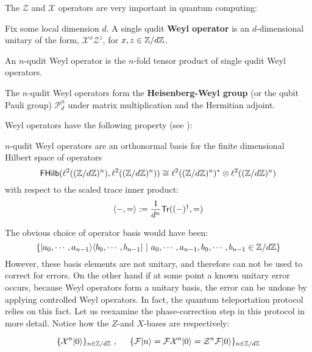 The $\mathcal Z$ and $\mathcal X$ operators are very important in quantum computing:
\begin{definition}
\label{definition:begin}
Fix some local dimension $d$.
A single qudit {\bf Weyl operator} is an $d$-dimensional unitary of the form, $\mathcal{X}^{x}\mathcal{Z}^{z}$, for $x,z \in \mathbb{Z}/d\mathbb{Z}$.

An $n$-qudit Weyl operator is the $n$-fold tensor product of single qudit Weyl operators.

The $n$-qudit Weyl operators form the {\bf Heisenberg-Weyl group} (or the qubit Pauli group) $\mathcal{P}_d^n$ under matrix multiplication and the Hermitian adjoint.
\end{definition}
Weyl operators have the following property (see \cite[\S 10.3.1]{nielsen}):
\begin{lemma}
\label{lem:ueb}
$n$-qudit Weyl operators are an orthonormal basis for the finite dimensional  Hilbert space of operators
$$
\mathsf{FHilb}(\ell^2((\mathbb{Z}/d\mathbb{Z})^n), \ell^2((\mathbb{Z}/d\mathbb{Z})^n))
\cong \ell^2((\mathbb{Z}/d\mathbb{Z})^n)^*\otimes \ell^2((\mathbb{Z}/d\mathbb{Z})^n)
$$
with respect to the scaled trace inner product:
$$
\langle  -,= \rangle
:=
\dfrac{1}{d^n}\mathsf{Tr}((-)^\dag,=)
$$
\end{lemma}
The obvious choice of operator basis would have been:
$$
\{ |a_0, \cdots, a_{n-1} \rangle \langle  b_0,\cdots, b_{n-1} | \ | \ a_0,\cdots, a_{n-1},b_0,\cdots, b_{n-1} \in \mathbb{Z}/d\mathbb{Z} \}
$$
However, these basis elements are not unitary, and therefore can not be used to correct for errors.
On the other hand if at some point a known unitary error occurs,  because Weyl operators form a unitary basis, the error can be undone by applying controlled Weyl operators.
In fact, the quantum teleportation protocol relies on this fact.
Let us reexamine the phase-correction step in this protocol in more detail.
Notice how the $Z$-and $X$-bases are respectively: 

$$\{ \mathcal{X}^n|0\rangle \}_{n\in \Z/d\Z}
\ , \hspace{,5cm} \{\mathcal{F}|n\rangle=\mathcal{F} \mathcal{X}^n |0\rangle =\mathcal{Z}^n \mathcal{F} |0\rangle\}_{n\in \Z/d\Z}$$

